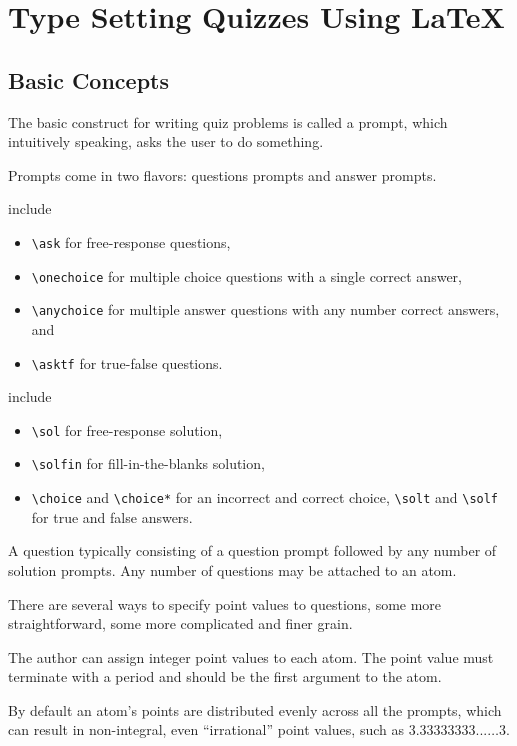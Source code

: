 \section{Type Setting Quizzes Using LaTeX}
\label{ch:quiz::typesetting}

\subsection{Basic Concepts}
The basic construct for writing quiz problems is called a  prompt, which intuitively speaking, asks the user to do something.


\begin{gram}[Prompts]
Prompts come in two flavors: questions prompts and answer prompts.
%

  include 
%
\begin{itemize}
\item \lstinline`\ask` for free-response questions, 
%
\item \lstinline`\onechoice` for multiple choice questions with a single correct answer, 
%
\item \lstinline`\anychoice` for multiple answer questions with any number correct answers, and 
%
\item \lstinline`\asktf` for true-false questions.
\end{itemize}

  include 
%
\begin{itemize}

\item \lstinline`\sol` for free-response solution, 
%
\item \lstinline`\solfin` for fill-in-the-blanks solution, 
%
\item \lstinline`\choice` and \lstinline`\choice*` for an incorrect and correct choice, 
%
\lstinline`\solt` and \lstinline`\solf`   for true and false answers.
\end{itemize}

A question typically consisting of a question prompt followed by any
number of solution prompts.  
%
Any number of questions may be attached  to an atom.
\end{gram}

%

\begin{gram}
There are several ways to specify point values to questions, some more
straightforward, some more complicated and finer grain.

The author can assign integer point values to each atom. 
%
The point value must terminate with a period and should be the first argument to the atom.
%

By default an atom's points are distributed evenly across all the
prompts, which can result in non-integral, even ``irrational'' point
values, such as $3.33333333...\ldots 3$.  
%
\end{gram}

